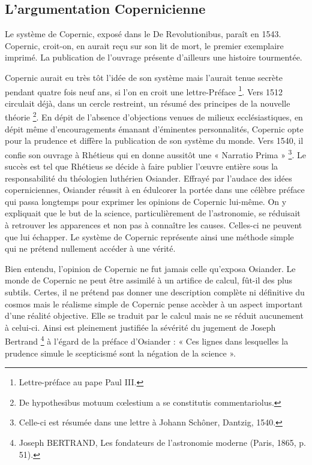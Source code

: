 \subsection{L’argumentation Copernicienne}

Le système de Copernic, exposé dans le De Revolutionibus, paraît
en 1543. Copernic, croit-on, en aurait reçu sur son lit de mort, le premier
exemplaire imprimé. La publication de l’ouvrage présente d’ailleurs
une histoire tourmentée.

Copernic aurait eu très tôt l’idée de son système mais l’aurait tenue
secrète pendant quatre fois neuf ans, si l’on en croit une lettre-Préface \footnote{Lettre-préface au pape Paul III.}.
Vers 1512 circulait déjà, dans un cercle restreint, un résumé des principes
de la nouvelle théorie \footnote{De hypothesibus motuum cœlestium a se constitutis commentariolus.}. En dépit de l’absence d’objections venues de
milieux ecclésiastiques, en dépit même d’encouragements émanant d’éminentes
personnalités, Copernic opte pour la prudence et diffère la publication
de son système du monde. Vers 1540, il confie son ouvrage à
Rhétieus qui en donne aussitôt une « Narratio Prima » \footnote{Celle-ci est résumée dans une lettre à Johann Schôner, Dantzig, 1540.}. Le succès
est tel que Rhétieus se décide à faire publier l’œuvre entière sous la
responsabilité du théologien luthérien Osiander. Effrayé par l’audace
des idées coperniciennes, Osiander réussit à en édulcorer la portée
dans une célèbre préface qui passa longtemps pour exprimer les opinions
de Copernic lui-même. On y expliquait que le but de la science, particulièrement
de l’astronomie, se réduisait à retrouver les apparences et non
pas à connaître les causes. Celles-ci ne peuvent que lui échapper. Le
système de Copernic représente ainsi une méthode simple qui ne prétend
nullement accéder à une vérité.

Bien entendu, l’opinion de Copernic ne fut jamais celle qu’exposa
Osiander. Le monde de Copernic ne peut être assimilé à un artifice de
calcul, fût-il des plus subtils. Certes, il ne prétend pas donner une description
complète ni définitive du cosmos mais le réalisme simple de
Copernic pense accèder à un aspect important d’une réalité objective.
Elle se traduit par le calcul mais ne se réduit aucunement à celui-ci. Ainsi
est pleinement justifiée la sévérité du jugement de Joseph Bertrand \footnote{Joseph BERTRAND, Les fondateurs de l’astronomie moderne (Paris, 1865, p. 51).} à
l’égard de la préface d’Osiander : « Ces lignes dans lesquelles la prudence
simule le scepticismé sont la négation de la science ».

